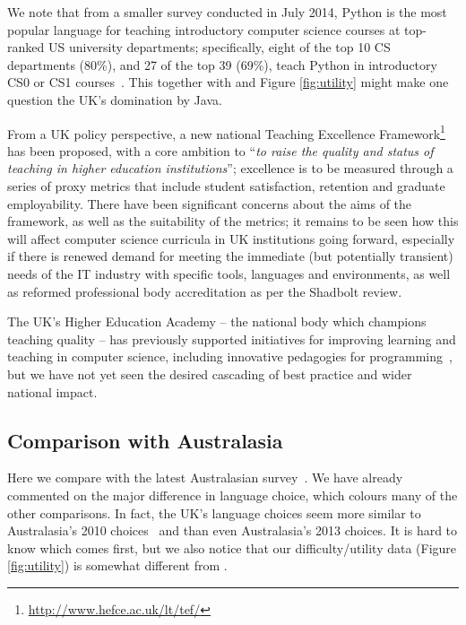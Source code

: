 \documentclass[a4paper,11pt]{article}
\begin{document}
We note that from a smaller survey conducted in July 2014, Python is
the most popular language for teaching introductory computer science
courses at top-ranked US university departments; specifically, eight
of the top 10 CS departments (80\%), and 27 of the top 39 (69\%),
teach Python in introductory CS0 or CS1 courses~\cite{guo:2014}.  This
together with \cite{mason+cooper:2014} and Figure \ref{fig:utility}
might make one question the UK's domination by Java.

From a UK policy perspective, a new national Teaching Excellence
Framework\footnote{\url{http://www.hefce.ac.uk/lt/tef/}} has been
proposed, with a core ambition to ``{\emph{to raise the quality and
status of teaching in higher education institutions}}''; excellence is
to be measured through a series of proxy metrics that include student
satisfaction, retention and graduate employability. There have been
significant concerns about the aims of the framework, as well as the
suitability of the metrics; it remains to be seen how this will affect
computer science curricula in UK institutions going forward,
especially if there is renewed demand for meeting the immediate (but
potentially transient) needs of the IT industry with specific tools,
languages and environments, as well as reformed professional body
accreditation as per the Shadbolt review.


The UK's Higher Education Academy -- the national body which champions
teaching quality -- has previously supported initiatives for improving
learning and teaching in computer science, including innovative
pedagogies for
programming~\cite{crick-et-al-hea:2015,davenport-et-al:latice2016},
but we have not yet seen the desired cascading of best practice and
wider national impact.

\subsection{Comparison with Australasia}

Here we compare with the latest Australasian
survey~\cite{mason+cooper:2014}. We have already commented on the
major difference in language choice, which colours many of the other
comparisons. In fact, the UK's language choices seem more similar to
Australasia's 2010 choices~\cite{mason-et-al:2012} and \cite[Table
4]{mason+cooper:2014} than even Australasia's 2013 choices. It is hard
to know which comes first, but we also notice that our
difficulty/utility data (Figure \ref{fig:utility}) is somewhat
different from \cite[Figures 7/8]{mason+cooper:2014}.
\end{document}
